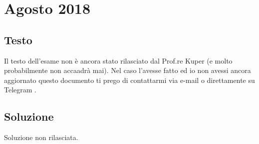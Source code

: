 \section{Agosto 2018}

\subsection*{Testo}

Il testo dell'esame non è ancora stato rilasciato dal Prof.re Kuper (e molto probabilmente non accaadrà mai). %
{\color{burgundy} Nel caso l'avesse fatto ed io non avessi ancora aggiornato questo documento ti prego di contattarmi via e-mail \href{mailto:emanuele.nardi@studenti.unitn.it}{\ExternalLink} o direttamente su Telegram \href{https://t.me/emanuelenardi}{\ExternalLink}.}

\subsection*{Soluzione}

Soluzione non rilasciata.

